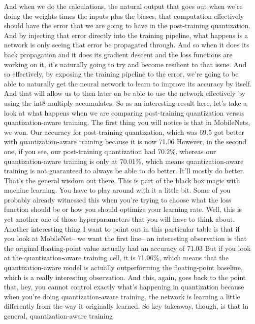 And when we do the calculations, the natural output that goes out
when we're doing the weights times the inputs plus the biases,
that computation effectively should have the error
that we are going to have in the post-training quantization.
And by injecting that error directly into the training pipeline, what
happens is a network is only seeing that error be propagated through.
And so when it does its back propagation and it does its gradient descent
and the loss functions are working on it,
it's naturally going to try and become resilient to that issue.
And so effectively, by exposing the training pipeline to the error,
we're going to be able to naturally get the neural network
to learn to improve its accuracy by itself.
And that will allow us to then later on be able to use the network effectively
by using the int8 multiply accumulates.
So as an interesting result here, let's take a look
at what happens when we are comparing post-training quantization
versus quantization-aware training.
The first thing you will notice is that in MobileNets, we won.
Our accuracy for post-training quantization, which was 69.5%
got better with quantization-aware training because it is now 71.06%
However, in the second one, if you see, our post-training quantization
had 70.2\%, whereas our quantization-aware training is only
at 70.01\%, which means quantization-aware training is not
guaranteed to always be able to do better.
It'll mostly do better.
That's the general wisdom out there.
This is part of the black box magic with machine learning.
You have to play around with it a little bit.
Some of you probably already witnessed this
when you're trying to choose what the loss function should be
or how you should optimize your learning rate.
Well, this is yet another one of those hyperparameters
that you will have to think about.
Another interesting thing I want to point out in this particular table
is that if you look at MobileNet--
we want the first line--
an interesting observation is that the original floating-point value actually
had an accuracy of 71.03%
But if you look at the quantization-aware training cell,
it is 71.06\%, which means that the quantization-aware model is actually
outperforming the floating-point baseline, which
is a really interesting observation.
And this, again, goes back to the point that, hey,
you cannot control exactly what's happening in quantization because when
you're doing quantization-aware training,
the network is learning a little differently from the way it originally
learned.
So key takeaway, though, is that in general, quantization-aware training

